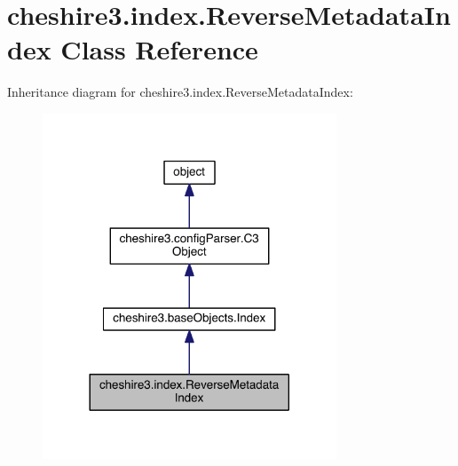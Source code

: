 \hypertarget{classcheshire3_1_1index_1_1_reverse_metadata_index}{\section{cheshire3.\-index.\-Reverse\-Metadata\-Index Class Reference}
\label{classcheshire3_1_1index_1_1_reverse_metadata_index}
}


Inheritance diagram for cheshire3.\-index.\-Reverse\-Metadata\-Index\-:
\nopagebreak
\begin{figure}[H]
\begin{center}
\leavevmode
\includegraphics[width=248pt]{classcheshire3_1_1index_1_1_reverse_metadata_index__inherit__graph}
\end{center}
\end{figure}


